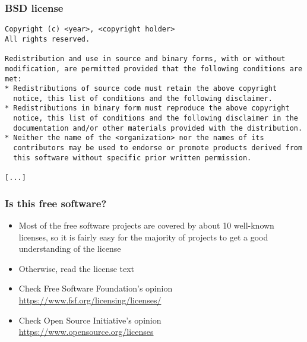 \begin{frame}[fragile]
  \frametitle{BSD license}
  \begin{block}{}
  \small
  \begin{verbatim}
Copyright (c) <year>, <copyright holder>
All rights reserved.

Redistribution and use in source and binary forms, with or without
modification, are permitted provided that the following conditions are
met:
* Redistributions of source code must retain the above copyright
  notice, this list of conditions and the following disclaimer.
* Redistributions in binary form must reproduce the above copyright
  notice, this list of conditions and the following disclaimer in the
  documentation and/or other materials provided with the distribution.
* Neither the name of the <organization> nor the names of its
  contributors may be used to endorse or promote products derived from
  this software without specific prior written permission.

[...]
\end{verbatim}
  \end{block}
\end{frame}

\begin{frame}
  \frametitle{Is this free software?}
  \begin{itemize}
  \item Most of the free software projects are covered by about 10
    well-known licenses, so it is fairly easy for the majority of
    projects to get a good understanding of the license
  \item Otherwise, read the license text
  \item Check Free Software Foundation's opinion\\
    \url{https://www.fsf.org/licensing/licenses/}
  \item Check Open Source Initiative's opinion\\
    \url{https://www.opensource.org/licenses}
  \end{itemize}
\end{frame}

